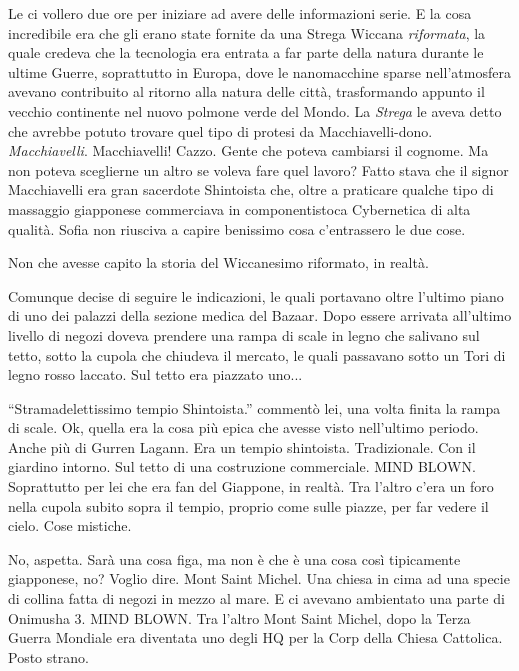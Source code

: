     Le ci vollero due ore per iniziare ad avere delle informazioni serie. E la cosa incredibile era che gli erano state
    fornite da una Strega Wiccana \emph{riformata}, la quale credeva che la tecnologia era entrata a far parte della
    natura durante le ultime Guerre, soprattutto in Europa, dove le nanomacchine sparse nell'atmosfera avevano
    contribuito al ritorno alla natura delle città, trasformando appunto il vecchio continente nel nuovo polmone verde
    del Mondo. La \emph{Strega} le aveva detto che avrebbe potuto trovare quel tipo di protesi da Macchiavelli-dono.
    \emph{Macchiavelli}. Macchiavelli! Cazzo. Gente che poteva cambiarsi il cognome. Ma non poteva sceglierne un altro
    se voleva fare quel lavoro? Fatto stava che il signor Macchiavelli era gran sacerdote Shintoista che, oltre a
    praticare qualche tipo di massaggio giapponese commerciava in componentistoca Cybernetica di alta qualità. Sofia non
    riusciva a capire benissimo cosa c'entrassero le due cose.

    Non che avesse capito la storia del Wiccanesimo riformato, in realtà.

    Comunque decise di seguire le indicazioni, le quali portavano oltre l'ultimo piano di uno dei palazzi della sezione
    medica del Bazaar. Dopo essere arrivata all'ultimo livello di negozi doveva prendere una rampa di scale in legno che
    salivano sul tetto, sotto la cupola che chiudeva il mercato, le quali passavano sotto un Tori di legno rosso
    laccato. Sul tetto era piazzato uno...

    ``Stramadelettissimo tempio Shintoista.'' commentò lei, una volta finita la rampa di scale. Ok, quella era la cosa
    più epica che avesse visto nell'ultimo periodo. Anche più di Gurren Lagann. Era un tempio shintoista. Tradizionale.
    Con il giardino intorno. Sul tetto di una costruzione commerciale. MIND BLOWN. Soprattutto per lei che era fan del
    Giappone, in realtà. Tra l'altro c'era un foro nella cupola subito sopra il tempio, proprio come sulle piazze, per
    far vedere il cielo. Cose mistiche.

    No, aspetta. Sarà una cosa figa, ma non è che è una cosa così tipicamente giapponese, no? Voglio dire. Mont Saint
    Michel. Una chiesa in cima ad una specie di collina fatta di negozi in mezzo al mare. E ci avevano ambientato una
    parte di Onimusha 3. MIND BLOWN. Tra l'altro Mont Saint Michel, dopo la Terza Guerra Mondiale era diventata uno
    degli HQ per la Corp della Chiesa Cattolica. Posto strano.


